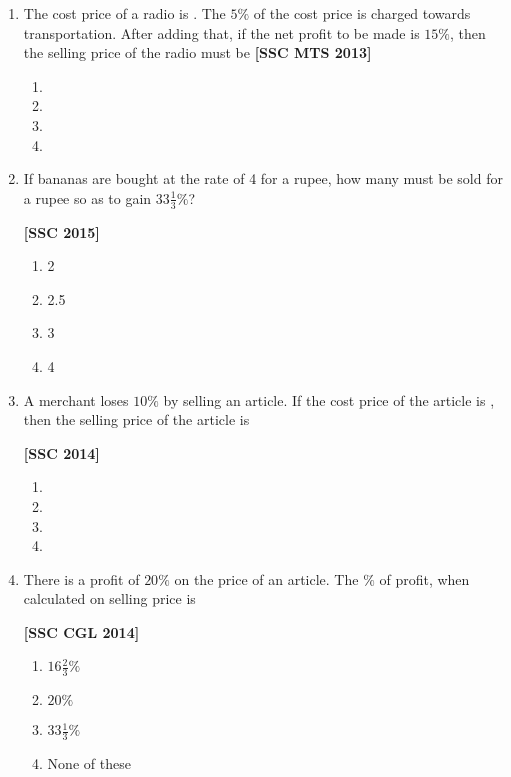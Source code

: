 \documentclass[twocolumn]{article}
\begin{document}
\begin{enumerate}
        \item The cost price of a radio is  . The $5\%$ of the cost price is charged towards transportation. After adding that, if the net profit to be made is $15\%$, then the selling price of the radio must be \hfill {\bf[SSC MTS 2013]}
            \begin{enumerate}
                \item {}
                \item {}
                \item {}
                \item {}
            \end{enumerate}
            
        \item If bananas are bought at the rate of 4 for a rupee, how many must be sold for a rupee so as to gain $33 \frac{1}{3} \%$? \\ \strut\hfill {\bf[SSC 2015]}
            \begin{enumerate}
                \item 2
                \item 2.5
                \item 3
                \item 4
            \end{enumerate}
            
        \item A merchant loses $10 \%$ by selling an article. If the cost price of the article is , then the selling price of the article is \\ \strut\hfill {\bf[SSC 2014]}
            \begin{enumerate}
                \item {}
                \item {}
                \item {}
                \item {}
            \end{enumerate}
            
        \item There is a profit of $20 \%$ on the price of an article. The $\%$ of profit, when calculated on selling price is \\ \strut\hfill {\bf[SSC CGL 2014]}
            \begin{enumerate}
                \item $16 \frac{2}{3} \%$
                \item $20 \%$
                \item $33 \frac{1}{3} \%$
                \item None of these
            \end{enumerate}
            

\end{enumerate}
\end{document}
